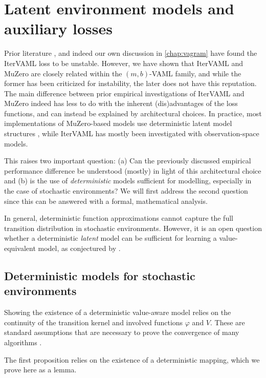 \section{Latent environment models and auxiliary losses}
Prior literature \parencite{lovatto2020decision}, and indeed our own discussion in \autoref{chap:vagram} have found the IterVAML loss to be unstable.
However, we have shown that IterVAML and MuZero are closely related within the $(m,b)$-VAML family, and while the former has been criticized for instability, the later does not have this reputation.
The main difference between prior empirical investigations of IterVAML and MuZero indeed has less to do with the inherent (dis)advantages of the loss functions, and can instead be explained by architectural choices.
In practice, most implementations of MuZero-based models use deterministic latent model structures \cite{schrittwieser2020mastering,ye2021mastering,hansen2022temporal,antonoglou2022planning}, while IterVAML has mostly been investigated with observation-space models.

This raises two important question: (a) Can the previously discussed empirical performance difference be understood (mostly) in light of this architectural choice and (b) is the use of \emph{deterministic} models sufficient for modelling, especially in the case of stochastic environments?
We will first address the second question since this can be answered with a formal, mathematical analysis. 

In general, deterministic function approximations cannot capture the full transition distribution in stochastic environments.
However, it is an open question whether a deterministic \emph{latent} model can be sufficient for learning a value-equivalent model, as conjectured by \textcite{oh2017value}.

\subsection{Deterministic models for stochastic environments}

Showing the existence of a deterministic value-aware model relies on the continuity of the transition kernel and involved functions $\varphi$ and $V$.
These are standard assumptions that are necessary to prove the convergence of many algorithms \parencite{bertsekasshreve1978}. 


The first proposition relies on the existence of a deterministic mapping, which we prove here as a lemma.


